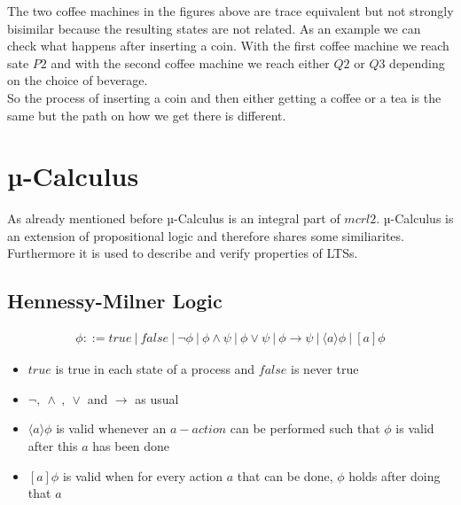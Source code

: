 \documentclass{report}
\begin{document}
  The two coffee machines in the figures above are trace equivalent but not strongly bisimilar because the resulting states are not related. As an example we can check what happens after inserting a coin. With the first coffee machine we reach sate $P2$ and with the second coffee machine we reach either $Q2$ or $Q3$ depending on the choice of beverage.\\
  So the process of inserting a coin and then either getting a coffee or a tea is the same but the path on how we get there is different.

  \section{µ-Calculus}
  As already mentioned before µ-Calculus is an integral part of $mcrl2$. µ-Calculus is an extension of propositional logic and therefore shares some similiarites. \\
  Furthermore it is used to describe and verify properties of LTSs.

  \subsection{Hennessy-Milner Logic}
  \begin{align*}
    \phi ::= \mathit{true}\ |\ \mathit{false}\ |\ \neg \phi\ |\ \phi \land \psi\ |\ \phi \lor \psi\ |\ \phi \to \psi\ |\ \langle a \rangle \phi \ |\ [a]\phi
  \end{align*}
  \begin{itemize}
    \item $\mathit{true}$ is true in each state of a process and $\mathit{false}$ is never true
    \item $\neg ,\ \land\ ,\ \lor$ and $\to$ as usual
    \item $\langle a \rangle \phi$ is valid whenever an $a-action$ can be performed such that $\phi$ is valid after this $a$ has been done
    \item $[a]\phi$ is valid when for every action $a$ that can be done, $\phi$ holds after doing that $a$
  \end{itemize}

  
\end{document}
